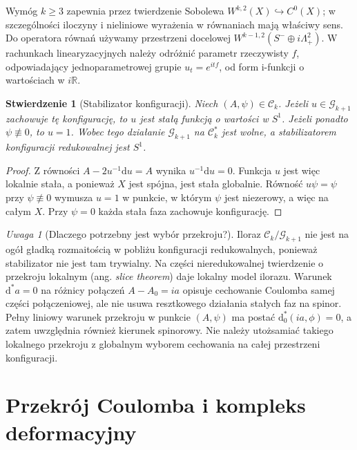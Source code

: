 \documentclass[11pt,a4paper]{report}
\numberwithin{equation}{section}
\theoremstyle{plain}
\newtheorem{stwierdzenie}[twierdzenie]{Stwierdzenie}
\theoremstyle{definition}
\theoremstyle{remark}
\newtheorem{uwaga}[twierdzenie]{Uwaga}
\begin{document}
Wymóg $k\geq3$ zapewnia przez twierdzenie Sobolewa
$W^{k,2}(X)\hookrightarrow C^0(X)$; w szczególności
iloczyny i nieliniowe wyrażenia w równaniach mają właściwy sens.
Do operatora równań używamy przestrzeni docelowej
$W^{k-1,2}(S^-\oplus i\Lambda^2_+)$. W rachunkach
linearyzacyjnych należy odróżnić parametr rzeczywisty $f$,
odpowiadający jednoparametrowej grupie $u_t=e^{itf}$, od form
i-funkcji o wartościach w $i\mathbb R$.

\begin{stwierdzenie}[Stabilizator konfiguracji]
\label{prop:tg-sw-stabilizer}
Niech $(A,\psi)\in\mathcal C_k$. Jeżeli $u\in\mathcal G_{k+1}$
zachowuje tę konfigurację, to $u$ jest stałą funkcją o wartości
w $S^1$. Jeżeli ponadto $\psi\not\equiv0$, to $u=1$.
Wobec tego działanie $\mathcal G_{k+1}$ na $\mathcal C_k^*$
jest wolne, a stabilizatorem konfiguracji redukowalnej jest $S^1$.
\end{stwierdzenie}

\begin{proof}
Z równości $A-2u^{-1}\mathrm du=A$ wynika
$u^{-1}\mathrm du=0$. Funkcja $u$ jest więc lokalnie stała,
a ponieważ $X$ jest spójna, jest stała globalnie.
Równość $u\psi=\psi$ przy $\psi\not\equiv0$ wymusza
$u=1$ w punkcie, w którym $\psi$ jest niezerowy,
a więc na całym $X$. Przy $\psi=0$ każda stała faza
zachowuje konfigurację.
\end{proof}

\begin{uwaga}[Dlaczego potrzebny jest wybór przekroju?]
Iloraz $\mathcal C_k/\mathcal G_{k+1}$ nie jest na ogół gładką
rozmaitością w pobliżu konfiguracji redukowalnych, ponieważ
stabilizator nie jest tam trywialny. Na części nieredukowalnej
twierdzenie o przekroju lokalnym (ang. \emph{slice theorem})
daje lokalny model ilorazu. Warunek $\mathrm d^*a=0$
na różnicy połączeń $A-A_0=ia$ opisuje cechowanie Coulomba
samej części połączeniowej, ale nie usuwa resztkowego działania
stałych faz na spinor. Pełny liniowy warunek przekroju
w punkcie $(A,\psi)$ ma postać $\mathrm d_0^*(ia,\phi)=0$,
a zatem uwzględnia również kierunek spinorowy.
Nie należy utożsamiać takiego lokalnego przekroju
z globalnym wyborem cechowania na całej przestrzeni konfiguracji.
\end{uwaga}

\section{Przekrój Coulomba i kompleks deformacyjny}
\label{sec:tg-sw-deform}
\end{document}
